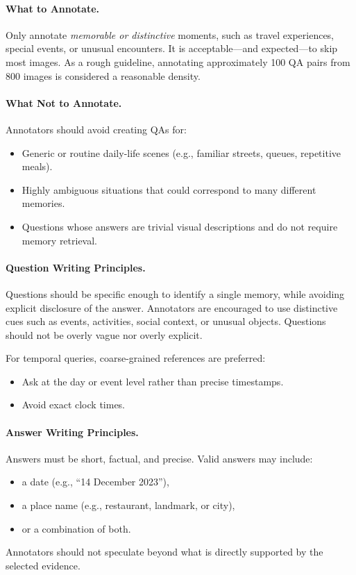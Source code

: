 \documentclass{article}
\theoremstyle{plain}
\theoremstyle{definition}
\theoremstyle{remark}
\begin{document}
\paragraph{What to Annotate.}
Only annotate \emph{memorable or distinctive} moments, such as travel experiences, special events, or unusual encounters.
It is acceptable—and expected—to skip most images.
As a rough guideline, annotating approximately 100 QA pairs from 800 images is considered a reasonable density.

\paragraph{What Not to Annotate.}
Annotators should avoid creating QAs for:
\begin{itemize}
    \item Generic or routine daily-life scenes (e.g., familiar streets, queues, repetitive meals).
    \item Highly ambiguous situations that could correspond to many different memories.
    \item Questions whose answers are trivial visual descriptions and do not require memory retrieval.
\end{itemize}

\paragraph{Question Writing Principles.}
Questions should be specific enough to identify a single memory, while avoiding explicit disclosure of the answer.
Annotators are encouraged to use distinctive cues such as events, activities, social context, or unusual objects.
Questions should not be overly vague nor overly explicit.

For temporal queries, coarse-grained references are preferred:
\begin{itemize}
    \item Ask at the day or event level rather than precise timestamps.
    \item Avoid exact clock times.
\end{itemize}

\paragraph{Answer Writing Principles.}
Answers must be short, factual, and precise.
Valid answers may include:
\begin{itemize}
    \item a date (e.g., ``14 December 2023''),
    \item a place name (e.g., restaurant, landmark, or city),
    \item or a combination of both.
\end{itemize}
Annotators should not speculate beyond what is directly supported by the selected evidence.
\end{document}
